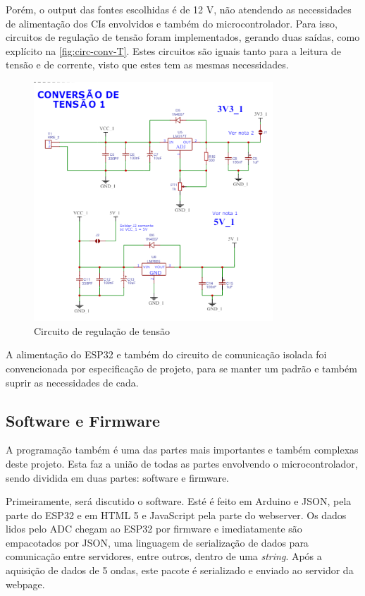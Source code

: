 Porém, o output das fontes escolhidas é de 12 V, não atendendo as necessidades de alimentação dos \gls{CI}s envolvidos e também do microcontrolador. Para isso, circuitos de regulação de tensão foram implementados, gerando duas saídas, como explícito na \autoref{fig:circ-conv-T}. Estes circuitos são iguais tanto para a leitura de tensão e de corrente, visto que estes tem as mesmas necessidades.

\begin{figure}[htb!]
    \caption{Circuito de regulação de tensão}
    \label{fig:circ-conv-T}
    \includegraphics[width=0.8\textwidth]{figuras/circ-conv-T.png}
    \fonte{}
\end{figure}

A alimentação do ESP32 e também do circuito de comunicação isolada foi convencionada por especificação de projeto, para se manter um padrão e também suprir as necessidades de cada.

\subsection{Software e Firmware}\label{softfirm}

A programação também é uma das partes mais importantes e também complexas deste projeto. Esta faz a união de todas as partes envolvendo o microcontrolador, sendo dividida em duas partes: software e firmware.

Primeiramente, será discutido o software. Esté é feito em Arduino e JSON, pela parte do ESP32 e em HTML 5 e JavaScript pela parte do webserver. Os dados lidos pelo \gls{ADC} chegam ao ESP32 por firmware e imediatamente são empacotados por JSON, uma linguagem de serialização de dados para comunicação entre servidores, entre outros, dentro de uma \textit{string}. Após a aquisição de dados de 5 ondas, este pacote é serializado e enviado ao servidor da webpage.

